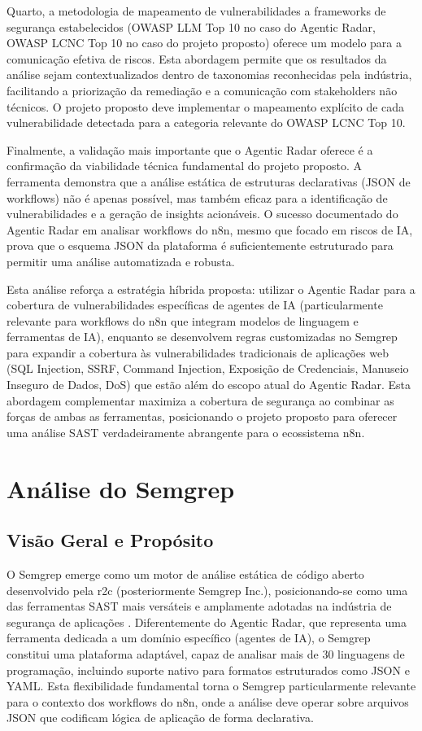 \documentclass{sftex}
\begin{document}
Quarto, a metodologia de mapeamento de vulnerabilidades a frameworks de segurança estabelecidos (OWASP LLM Top 10 no caso do Agentic Radar, OWASP LCNC Top 10 no caso do projeto proposto) oferece um modelo para a comunicação efetiva de riscos. Esta abordagem permite que os resultados da análise sejam contextualizados dentro de taxonomias reconhecidas pela indústria, facilitando a priorização da remediação e a comunicação com stakeholders não técnicos. O projeto proposto deve implementar o mapeamento explícito de cada vulnerabilidade detectada para a categoria relevante do OWASP LCNC Top 10.

Finalmente, a validação mais importante que o Agentic Radar oferece é a confirmação da viabilidade técnica fundamental do projeto proposto. A ferramenta demonstra que a análise estática de estruturas declarativas (JSON de workflows) não é apenas possível, mas também eficaz para a identificação de vulnerabilidades e a geração de insights acionáveis. O sucesso documentado do Agentic Radar em analisar workflows do n8n, mesmo que focado em riscos de IA, prova que o esquema JSON da plataforma é suficientemente estruturado para permitir uma análise automatizada e robusta.

Esta análise reforça a estratégia híbrida proposta: utilizar o Agentic Radar para a cobertura de vulnerabilidades específicas de agentes de IA (particularmente relevante para workflows do n8n que integram modelos de linguagem e ferramentas de IA), enquanto se desenvolvem regras customizadas no Semgrep para expandir a cobertura às vulnerabilidades tradicionais de aplicações web (SQL Injection, SSRF, Command Injection, Exposição de Credenciais, Manuseio Inseguro de Dados, DoS) que estão além do escopo atual do Agentic Radar. Esta abordagem complementar maximiza a cobertura de segurança ao combinar as forças de ambas as ferramentas, posicionando o projeto proposto para oferecer uma análise SAST verdadeiramente abrangente para o ecossistema n8n.

\section{Análise do Semgrep}

\subsection{Visão Geral e Propósito}

O Semgrep emerge como um motor de análise estática de código aberto desenvolvido pela r2c (posteriormente Semgrep Inc.), posicionando-se como uma das ferramentas SAST mais versáteis e amplamente adotadas na indústria de segurança de aplicações \cite{semgrep_platform}. Diferentemente do Agentic Radar, que representa uma ferramenta dedicada a um domínio específico (agentes de IA), o Semgrep constitui uma plataforma adaptável, capaz de analisar mais de 30 linguagens de programação, incluindo suporte nativo para formatos estruturados como JSON e YAML. Esta flexibilidade fundamental torna o Semgrep particularmente relevante para o contexto dos workflows do n8n, onde a análise deve operar sobre arquivos JSON que codificam lógica de aplicação de forma declarativa.
\end{document}
